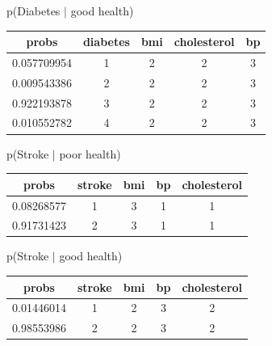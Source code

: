 \documentclass[11pt]{article}
\begin{document}
p(Diabetes $|$ good health)

\begin{table}[!hbt]
\begin{center}
\begin{tabular}{ |c|c|c|c|c| }
  \hline
  probs & diabetes & bmi & cholesterol & bp \\
  \hline
  0.057709954 & 1 & 2 & 2 & 3\\
  \hline
  0.009543386 & 2 & 2 & 2 & 3 \\
  \hline
  0.922193878  & 3  &  2 &  2 & 3 \\
  \hline
  0.010552782  &   4  & 2   & 2 & 3 \\
  \hline
\end{tabular}
\end{center}
\end{table}
\vspace{-20pt}


p(Stroke $|$ poor health)

\begin{table}[!hbt]
\begin{center}
\begin{tabular}{ |c|c|c|c|c| }
  \hline
  probs & stroke & bmi & bp & cholesterol \\
  \hline
  0.08268577 & 1 & 3 & 1 & 1\\
  \hline
  0.91731423 & 2 & 3 & 1 & 1 \\
  \hline
\end{tabular}
\end{center}
\end{table}
\vspace{-20pt}

p(Stroke $|$ good health)

\begin{table}[!hbt]
\begin{center}
\begin{tabular}{ |c|c|c|c|c| }
  \hline
  probs & stroke & bmi & bp & cholesterol \\
  \hline
  0.01446014 & 1 & 2 & 3 & 2\\
  \hline
  0.98553986 & 2 & 2 & 3 & 2 \\
  \hline
\end{tabular}
\end{center}
\end{table}
\vspace{-20pt}

\clearpage
\end{document}
